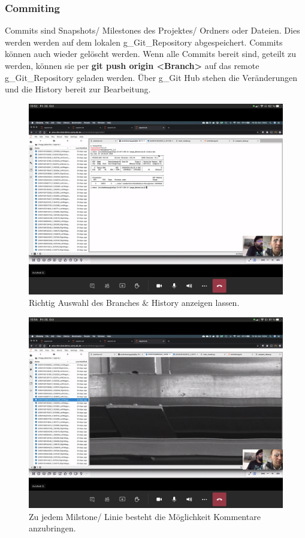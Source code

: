 \subsubsection{Commiting}
Commits sind Snapshots/ Milestones des Projektes/ Ordners oder Dateien. Dies werden werden auf dem lokalen \gls{g_Git_Repository} abgespeichert. Commits können auch wieder gelöscht werden. Wenn alle Commits bereit sind, geteilt zu werden, können sie per \textbf{git push origin <Branch>} auf das remote \gls{g_Git_Repository} geladen werden. 
Über \gls{g_Git} Hub stehen die Veränderungen und die History bereit zur Bearbeitung.

\begin{figure}[H]
	\centering
	\includegraphics[width=0.7\linewidth]{attachment/chapter_6/Scc004}
	\caption{Richtig Auswahl des Branches $\&$ History anzeigen lassen.}
\end{figure}

\begin{figure}[H]
	\centering
	\includegraphics[width=0.7\linewidth]{attachment/chapter_6/Scc005}
	\caption{Zu jedem Milstone/ Linie besteht die Möglichkeit Kommentare anzubringen.}
\end{figure}

